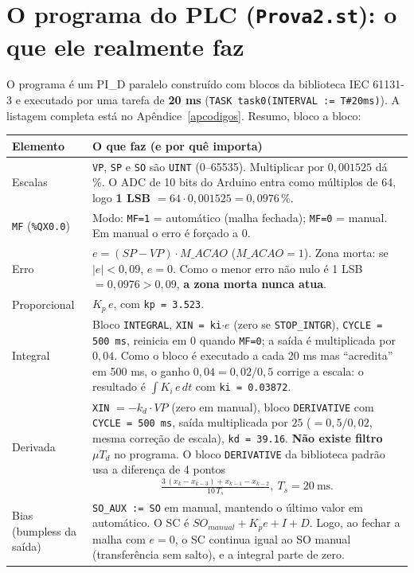 \section{O programa do PLC (\texttt{Prova2.st}): o que ele realmente faz}\label{secst}
O programa é um PI\_D paralelo construído com blocos da biblioteca IEC 61131-3 e executado por uma tarefa de \textbf{20 ms} (\texttt{TASK task0(INTERVAL := T\#20ms)}). A listagem completa está no Apêndice~\ref{apcodigos}. Resumo, bloco a bloco:
\begin{center}\small
\begin{longtable}{p{3.4cm}p{11.2cm}}
\toprule \textbf{Elemento} & \textbf{O que faz (e por quê importa)}\\\midrule\endhead
Escalas & \texttt{VP}, \texttt{SP} e \texttt{SO} são \texttt{UINT} (0--65535). Multiplicar por $0{,}001525$ dá \%. O ADC de 10 bits do Arduino entra como múltiplos de 64, logo \textbf{1 LSB $=64\cdot0{,}001525=0{,}0976\,\%$}.\\
\texttt{MF} (\texttt{\%QX0.0}) & Modo: \texttt{MF=1} = automático (malha fechada); \texttt{MF=0} = manual. Em manual o erro é forçado a 0.\\
Erro & $e=(SP-VP)\cdot M\_ACAO$ ($M\_ACAO=1$). Zona morta: se $|e|<0{,}09$, $e=0$. Como o menor erro não nulo é 1 LSB $=0{,}0976>0{,}09$, \textbf{a zona morta nunca atua}.\\
Proporcional & $K_p\,e$, com \texttt{kp = 3.523}.\\
Integral & Bloco \texttt{INTEGRAL}, \texttt{XIN = ki$\cdot e$} (zero se \texttt{STOP\_INTGR}), \texttt{CYCLE = 500 ms}, reinicia em 0 quando \texttt{MF=0}; a saída é multiplicada por $0{,}04$. Como o bloco é executado a cada 20 ms mas ``acredita'' em 500 ms, o ganho $0{,}04=0{,}02/0{,}5$ corrige a escala: o resultado é $\int K_i\,e\,dt$ com \texttt{ki = 0.03872}.\\
Derivada & \texttt{XIN} $=-k_d\cdot VP$ (zero em manual), bloco \texttt{DERIVATIVE} com \texttt{CYCLE = 500 ms}, saída multiplicada por $25$ ($=0{,}5/0{,}02$, mesma correção de escala), \texttt{kd = 39.16}. \textbf{Não existe filtro $\mu T_d$} no programa. O bloco \texttt{DERIVATIVE} da biblioteca padrão usa a diferença de 4 pontos
\[\tfrac{3\,(x_k-x_{k-3})+x_{k-1}-x_{k-2}}{10\,T_s},\ T_s=20\ \mathrm{ms}.\]\\
Bias (bumpless da saída) & \texttt{SO\_AUX := SO} em manual, mantendo o último valor em automático. O SC é $SO_{manual}+K_pe+I+D$. Logo, ao fechar a malha com $e=0$, o SC continua igual ao SO manual (transferência sem salto), e a integral parte de zero.\\

\end{longtable}
\end{center}
